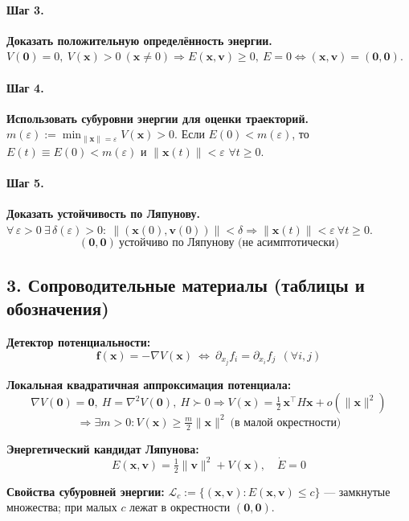 \paragraph{Шаг 3.} \textbf{Доказать положительную определённость энергии.}\\
\(V(\mathbf 0)=0,\ V(\mathbf x)>0\ (\mathbf x\neq 0)\Rightarrow 
\boxed{E(\mathbf x,\mathbf v)\ge 0,\ E=0\Leftrightarrow (\mathbf x,\mathbf v)=(\mathbf 0,\mathbf 0)}\).

\paragraph{Шаг 4.} \textbf{Использовать субуровни энергии для оценки траекторий.}\\
\(m(\varepsilon):=\min_{\|\mathbf x\|=\varepsilon}V(\mathbf x)>0\). 
Если \(E(0)<m(\varepsilon)\), то \(E(t)\equiv E(0)<m(\varepsilon)\) и \(\|\mathbf x(t)\|<\varepsilon\) \(\forall t\ge0\).

\paragraph{Шаг 5.} \textbf{Доказать устойчивость по Ляпунову.}\\
\(\forall\,\varepsilon>0\ \exists\,\delta(\varepsilon)>0:\ \|(\mathbf x(0),\mathbf v(0))\|<\delta\Rightarrow \|\mathbf x(t)\|<\varepsilon\ \forall t\ge0\). 
\[
\boxed{\ (\mathbf 0,\mathbf 0)\ \text{устойчиво по Ляпунову (не асимптотически)}\ }
\]

\subsection*{3. Сопроводительные материалы (таблицы и обозначения)}

\textbf{Детектор потенциальности:}
\[
\mathbf f(\mathbf x)=-\nabla V(\mathbf x)\ \Leftrightarrow\ \partial_{x_j}f_i=\partial_{x_i}f_j\ \ (\forall i,j)
\]

\textbf{Локальная квадратичная аппроксимация потенциала:}
\[
\nabla V(\mathbf 0)=\mathbf 0,\ H=\nabla^{2}V(\mathbf 0),\ H\succ0\Rightarrow 
V(\mathbf x)=\tfrac12\,\mathbf x^{\!\top}H\mathbf x+o(\|\mathbf x\|^{2})
\]
\[
\Rightarrow \exists m>0: V(\mathbf x)\ge \tfrac m2\|\mathbf x\|^{2}\ \text{(в малой окрестности)}
\]

\textbf{Энергетический кандидат Ляпунова:}
\[
\boxed{E(\mathbf x,\mathbf v)=\tfrac12\|\mathbf v\|^{2}+V(\mathbf x)},\quad \boxed{\dot E=0}
\]

\textbf{Свойства субуровней энергии:}
\(\mathcal L_{c}:=\{(\mathbf x,\mathbf v):E(\mathbf x,\mathbf v)\le c\}\) — замкнутые множества; при малых \(c\) лежат в окрестности \((\mathbf 0,\mathbf 0)\).

